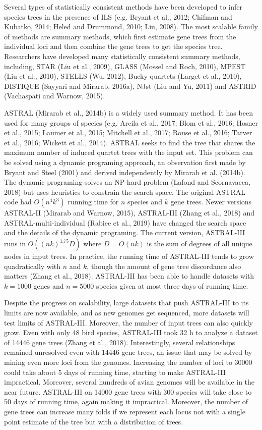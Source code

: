 \documentclass[12pt]{article}
\begin{document}
Several types of statistically consistent methods have been developed to infer species trees in the presence of ILS (e.g. Bryant et al., 2012; Chifman and Kubatko, 2014; Heled and Drummond, 2010; Liu, 2008). The most scalable family of methods are summary methods, which first estimate gene trees from the individual loci and then combine the gene trees to get the species tree. Researchers have developed many statistically consistent summary methods, including, STAR (Liu et al., 2009), GLASS (Mossel and Roch, 2010), MPEST (Liu et al., 2010), STELLS (Wu, 2012), Bucky-quartets (Larget et al., 2010), DISTIQUE (Sayyari and Mirarab, 2016a), NJst (Liu and Yu, 2011) and ASTRID (Vachaspati and Warnow, 2015).

ASTRAL (Mirarab et al., 2014b) is a widely used summary method. It has been used for many groups of species (e.g. Arcila et al., 2017; Blom et al., 2016; Hosner et al., 2015; Laumer et al., 2015; Mitchell et al., 2017; Rouse et al., 2016; Tarver et al., 2016; Wickett et al., 2014). ASTRAL seeks to find the tree that shares the maximum number of induced quartet trees with the input set. This problem can be solved using a dynamic programing approach, an observation first made by Bryant and Steel (2001) and derived independently by Mirarab et al. (2014b). The dynamic programing solves an NP-hard problem (Lafond and Scornavacca, 2018) but uses heuristics to constrain the search space. The original ASTRAL code had $O(n^4 k^3)$ running time for $n$ species and $k$ gene trees. Newer versions ASTRAL-II (Mirarab and Warnow, 2015), ASTRAL-III (Zhang et al., 2018) and ASTRAL-multi-individual (Rabiee et al., 2019) have changed the search space and the details of the dynamic programing. The current version, ASTRAL-III runs in $O((n k)^{1.75} D)$ where $D=O(n k)$ is the sum of degrees of all unique nodes in input trees. In practice, the running time of ASTRAL-III tends to grow quadratically with $n$ and $k$, though the amount of gene tree discordance also matters (Zhang et al., 2018). ASTRAL-III has been able to handle datasets with $k=1000$ genes and $n=5000$ species given at most three days of running time.

Despite the progress on scalability, large datasets that push ASTRAL-III to its limits are now available, and as new genomes get sequenced, more datasets will test limits of ASTRAL-III. Moreover, the number of input trees can also quickly grow. Even with only 48 bird species, ASTRAL-III took 32 h to analyze a dataset of 14446 gene trees (Zhang et al., 2018). Interestingly, several relationships remained unresolved even with 14446 gene trees, an issue that may be solved by mining even more loci from the genomes. Increasing the number of loci to 30000 could take about 5 days of running time, starting to make ASTRAL-III impractical. Moreover, several hundreds of avian genomes will be available in the near future. ASTRAL-III on 14000 gene trees with 300 species will take close to 50 days of running time, again making it impractical. Moreover, the number of gene trees can increase many folds if we represent each locus not with a single point estimate of the tree but with a distribution of trees.
\end{document}
